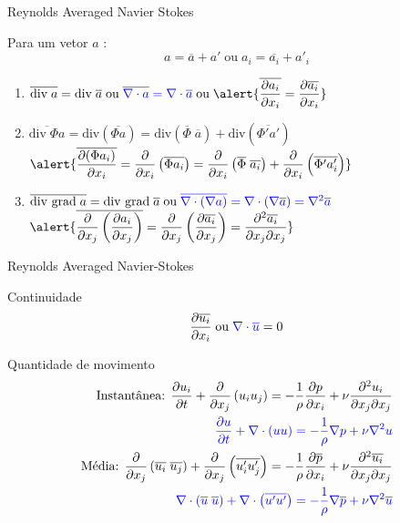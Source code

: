 \documentclass[10pt]{beamer}
\newcommand{\ddt}[1]{\dfrac{\partial #1}{\partial t}}
\newcommand{\tgrad}[1]{\dfrac{\partial #1}{\partial x_j}}
\newcommand{\ddx}[2]{\dfrac{\partial #1}{\partial x_{#2}}}
\newcommand{\ddxp}[2]{\dfrac{\partial }{\partial x_{#2}}\left(#1\right)}
\newcommand{\laplace}[1]{\dfrac{\partial^2 #1}{\partial x_{j}\partial x_{j}}}
\newcommand{\m}[1]{\overline{#1}}
\newcommand{\divp}[1]{\nabla \cdot \left(#1\right)}
\newcommand{\blue}[1]{{\color{blue}#1}}
\begin{document}
\begin{frame}{Reynolds Averaged Navier Stokes}
	\begin{block}{Para um vetor $a$ :}
		\begin{equation*}
		a = \m{a} + a' \;\text{ou}\; a_i = \m{a_i} + a'_i
		\end{equation*}
	\end{block}
	
	\begin{enumerate}[$\bullet$]
		\item $ \m{\text{div}\;a} = \text{div}\;\m{a} \;\text{ou}\;
		\blue{\m{\nabla \cdot a} = \nabla \cdot \m{a}}\;\text{ou}\; \alert{\m{\dfrac{\partial a_i}{\partial x_i}} 
		= \dfrac{\partial \m{a_i}}{\partial x_i}} $
		
		\vspace*{0.4cm}
		\item $ \m{\text{div}\;\Phi a} = \text{div}\left(\m{\Phi a}\right)
		=  \text{div}\left(\m{\Phi}\;\m{a}\right) + \text{div}\left(\m{\Phi' a'}\right) $ \\ \vspace*{0.4cm}
		$\alert{\m{\ddx{(\Phi a_i)}{i}}	= \ddxp{\m{\Phi a_i}}{i}
		= \ddxp{\m{\Phi}\;\m{a_i}}{i} + \ddxp{\m{\Phi' a'_i}}{i}}$
		
		\vspace*{0.4cm}
		\item $ \m{\text{div }\text{grad}\;a} = \text{div }\text{grad} \;\m{a} \;\text{ou}\;\blue{\m{\divp{\nabla a}} = \divp{\nabla\m{a}} = \nabla^2\m{a}} $ \\ \vspace*{0.4cm}
		$ \alert{\m{\ddxp{\tgrad{a_i}}{j}} = \ddxp{\tgrad{\m{a_i}}}{j} = \laplace{\m{a_i}}} $
	\end{enumerate}

\end{frame}

\begin{frame}{Reynolds Averaged Navier-Stokes}
	\begin{block}{Continuidade}
		\begin{equation*}
		 \ddx{\m{u_i}}{i} \;\text{ou}\; \blue{\nabla \cdot \m{u}} = 0
		\end{equation*}
	\end{block}

	\begin{block}{Quantidade de movimento}
		\begin{align*}
		\text{Instantânea: }\ddt{u_i} +\ddxp{u_i u_j}{j} = - \dfrac{1}{\rho} \ddx{p}{i} + \nu\laplace{u_i} \\
		\blue{\ddt{u} +\divp{u u} = - \dfrac{1}{\rho} \nabla p + \nu\nabla^2 u} \\
		\text{Média: }\ddxp{\m{u_i}\;\m{u_j}}{j} + \ddxp{\m{u'_i u'_j}}{j} = - \dfrac{1}{\rho} \ddx{\m{p}}{i} + \nu \laplace{\m{u_i}} \\
		\blue{\divp{\m{u}\;\m{u}} + \divp{\m{u' u'}} = - \dfrac{1}{\rho} \nabla\m{p} + \nu\nabla^2\m{u}}
		\end{align*}
	\end{block}
\end{frame}
\end{document}
